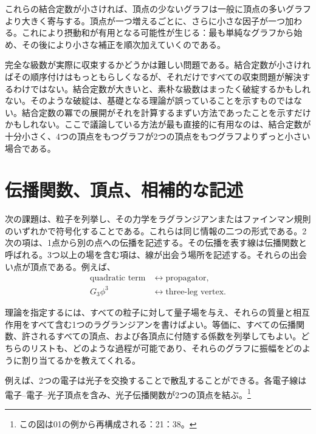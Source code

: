 これらの結合定数が小さければ、頂点の少ないグラフは一般に頂点の多いグラフより大きく寄与する。頂点が一つ増えるごとに、さらに小さな因子が一つ加わる。これにより摂動和が有用となる可能性が生じる：最も単純なグラフから始め、その後により小さな補正を順次加えていくのである。

完全な級数が実際に収束するかどうかは難しい問題である。結合定数が小さければその順序付けはもっともらしくなるが、それだけですべての収束問題が解決するわけではない。結合定数が大きいと、素朴な級数はまったく破綻するかもしれない。そのような破綻は、基礎となる理論が誤っていることを示すものではない。結合定数の冪での展開がそれを計算するまずい方法であったことを示すだけかもしれない。ここで議論している方法が最も直接的に有用なのは、結合定数が十分小さく、4つの頂点をもつグラフが2つの頂点をもつグラフよりずっと小さい場合である。

\begin{classroomqa}
\end{classroomqa}

\section{伝播関数、頂点、相補的な記述}

次の課題は、粒子を列挙し、その力学をラグランジアンまたはファインマン規則のいずれかで符号化することである。これらは同じ情報の二つの形式である。2次の項は、1点から別の点への伝播を記述する。その伝播を表す線は伝播関数と呼ばれる。3つ以上の場を含む項は、線が出会う場所を記述する。それらの出会い点が頂点である。例えば、
\begin{equation}
\begin{aligned}
\text{quadratic term}
&\longleftrightarrow \text{propagator},\\
G_3\phi^3
&\longleftrightarrow \text{three-leg vertex}.
\end{aligned}
\end{equation}

理論を指定するには、すべての粒子に対して量子場を与え、それらの質量と相互作用をすべて含む1つのラグランジアンを書けばよい。等価に、すべての伝播関数、許されるすべての頂点、および各頂点に付随する係数を列挙してもよい。どちらのリストも、どのような過程が可能であり、それらのグラフに振幅をどのように割り当てるかを教えてくれる。

例えば、2つの電子は光子を交換することで散乱することができる。各電子線は電子--電子--光子頂点を含み、光子伝播関数が2つの頂点を結ぶ。\footnote{この図は01の例から再構成される：21：38。}

